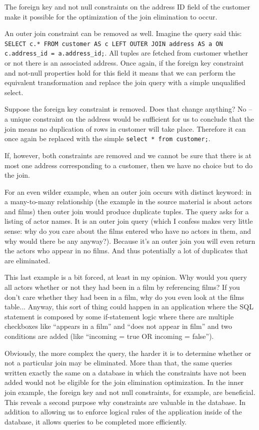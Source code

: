 The foreign key and not null constraints on the address ID field of the customer make it possible for the optimization of the join elimination to occur.

An outer join constraint can be removed as well. Imagine the query said this: \texttt{SELECT c.* FROM customer AS c LEFT OUTER JOIN address AS a ON c.address\_id = a.address\_id;}. All tuples are fetched from customer whether or not there is an associated address. Once again, if the foreign key constraint and not-null properties hold for this field it means that we can perform the equivalent transformation and replace the join query with a simple unqualified select. 

Suppose the foreign key constraint is removed. Does that change anything? No -- a unique constraint on the address would be sufficient for us to conclude that the join means no duplication of rows in customer will take place. Therefore it can once again be replaced with the simple \texttt{select * from customer;}.

If, however, both constraints are removed and we cannot be sure that there is at most one address corresponding to a customer, then we have no choice but to do the join.

For an even wilder example, when an outer join occurs with distinct keyword: in a many-to-many relationship (the example in the source material is about actors and films) then outer join would produce duplicate tuples. The query asks for a listing of actor names. It is an outer join query (which I confess makes very little sense: why do you care about the films entered who have no actors in them, and why would there be any anyway?). Because it's an outer join you will even return the actors who appear in no films. And thus potentially a lot of duplicates that are eliminated. 

This last example is a bit forced, at least in my opinion. Why would you query all actors whether or not they had been in a film by referencing films? If you don't care whether they had been in a film, why do you even look at the films table... Anyway, this sort of thing could happen in an application where the SQL statement is composed by some if-statement logic where there are multiple checkboxes like ``appears in a film'' and ``does not appear in film'' and two conditions are added (like ``incoming = true OR incoming = false'').

Obviously, the more complex the query, the harder it is to determine whether or not a particular join may be eliminated. More than that, the same queries written exactly the same on a database in which the constraints have not been added would not be eligible for the join elimination optimization. In the inner join example, the foreign key and not null constraints, for example, are beneficial. This reveals a second purpose why constraints are valuable in the database. In addition to allowing us to enforce logical rules of the application inside of the database, it allows queries to be completed more efficiently.

